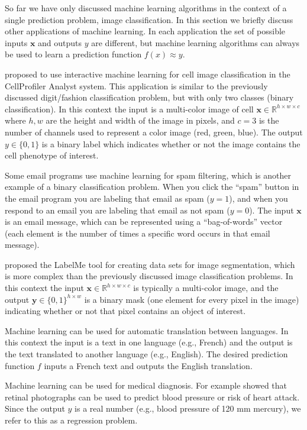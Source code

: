 \documentclass[12pt]{article}
\begin{document}
So far we have only discussed machine learning algorithms in the
context of a single prediction problem, image classification. In this
section we briefly discuss other applications of machine learning. In
each application the set of possible inputs $\mathbf x$ and outputs
$y$ are different, but machine learning algorithms can always be used
to learn a prediction function $f(x)\approx y$. 

\citep{Jones2009} proposed to use interactive machine learning for
cell image classification in the CellProfiler Analyst system. This
application is similar to the previously discussed digit/fashion
classification problem, but with only two classes (binary
classification). In this context the input is a multi-color image of
cell $\mathbf x\in\mathbb R^{h \times w \times c}$ where $h,w$ are the
height and width of the image in pixels, and $c=3$ is the number of
channels used to represent a color image (red, green, blue). The
output $y\in\{0,1\}$ is a binary label which indicates whether or not
the image contains the cell phenotype of interest. 

Some email programs use machine learning for spam filtering, which is
another example of a binary classification problem. When you click the
``spam'' button in the email program you are labeling that email as
spam ($y=1$), and when you respond to an email you are labeling that
email as not spam ($y=0$). The input $\mathbf x$ is an email message,
which can be represented using a ``bag-of-words'' vector (each element
is the number of times a specific word occurs in that email message).

\citet{Russell2008} proposed the LabelMe tool for creating data sets
for image segmentation, which is more complex than the previously
discussed image classification problems. In this context the input
$\mathbf x\in\mathbb R^{h \times w \times c}$ is typically a
multi-color image, and the output
$\mathbf y\in \{0,1\}^{h \times w}$ is a binary mask (one element
for every pixel in the image) indicating whether or not that pixel
contains an object of interest.

Machine learning can be used for automatic translation between
languages. In this context the input is a text in one language (e.g.,
French) and the output is the text translated to another language
(e.g., English). The desired prediction function $f$ inputs a French
text and outputs the English translation.

Machine learning can be used for medical diagnosis. For example
\citet{Poplin2017} showed that retinal photographs can be used to
predict blood pressure or risk of heart attack. Since the output $y$
is a real number (e.g., blood pressure of 120 mm mercury), we refer to
this as a regression problem.
\end{document}
